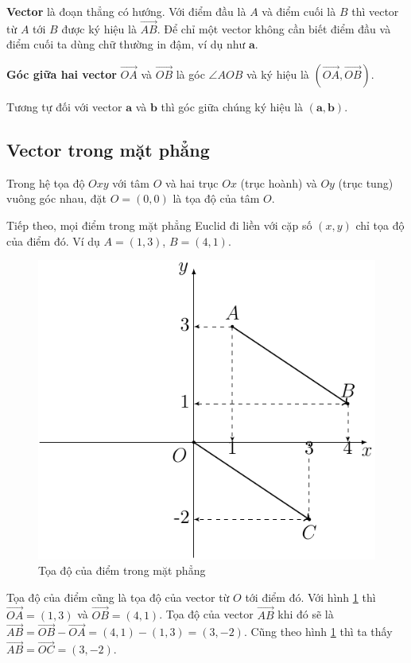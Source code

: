 \textbf{Vector} là đoạn thẳng có hướng. Với điểm đầu là $A$ và điểm cuối là $B$ thì vector từ $A$ tới $B$ được ký hiệu là $\overrightarrow{AB}$. Để chỉ một vector không cần biết điểm đầu và điểm cuối ta dùng chữ thường in đậm, ví dụ như $\bm{a}$.

\textbf{Góc giữa hai vector} $\overrightarrow{OA}$ và $\overrightarrow{OB}$ là góc $\angle AOB$ và ký hiệu là $(\overrightarrow{OA}, \overrightarrow{OB})$.

Tương tự đối với vector $\bm{a}$ và $\bm{b}$ thì góc giữa chúng ký hiệu là $(\bm{a}, \bm{b})$.

\subsection*{Vector trong mặt phẳng}

Trong hệ tọa độ $Oxy$ với tâm $O$ và hai trục $Ox$ (trục hoành) và $Oy$ (trục tung) vuông góc nhau, đặt $O = (0, 0)$ là tọa độ của tâm $O$.

Tiếp theo, mọi điểm trong mặt phẳng Euclid đi liền với cặp số $(x, y)$ chỉ tọa độ của điểm đó. Ví dụ $A = (1, 3)$, $B = (4, 1)$.

\begin{figure}[ht]
	\centering
	\includegraphics[page=1]{analytic_geometry/oxy.pdf}
	\caption{Tọa độ của điểm trong mặt phẳng}
	\label{oxy1}
\end{figure}

Tọa độ của điểm cũng là tọa độ của vector từ $O$ tới điểm đó. Với hình \ref{oxy1} thì $\overrightarrow{OA} = (1, 3)$ và $\overrightarrow{OB} = (4, 1)$. Tọa độ của vector $\overrightarrow{AB}$ khi đó sẽ là $\overrightarrow{AB} = \overrightarrow{OB} - \overrightarrow{OA} = (4, 1) - (1, 3) = (3, -2)$. Cũng theo hình \ref{oxy1} thì ta thấy $\overrightarrow{AB} = \overrightarrow{OC} = (3, -2)$. 

